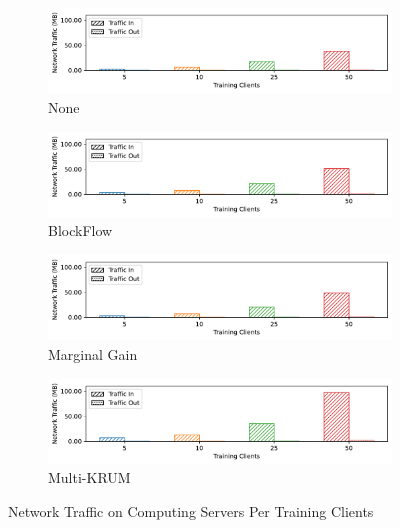 \begin{figure}[!hp]
    \centering
    \begin{subfigure}[b]{0.49\textwidth}
        \centering
        \includegraphics[width=\textwidth]{graphics/clients/net_none_server.pdf}
        \caption{None}
    \end{subfigure}
    \hfill
    \begin{subfigure}[b]{0.49\textwidth}
        \centering
        \includegraphics[width=\textwidth]{graphics/clients/net_blockflow_server.pdf}
        \caption{BlockFlow}
    \end{subfigure}
    \hfill
    \begin{subfigure}[b]{0.49\textwidth}
        \centering
        \includegraphics[width=\textwidth]{graphics/clients/net_marginalgain_server.pdf}
        \caption{Marginal Gain}
    \end{subfigure}
    \hfill
    \begin{subfigure}[b]{0.49\textwidth}
        \centering
        \includegraphics[width=\textwidth]{graphics/clients/net_multikrum_server.pdf}
        \caption{Multi-KRUM}
    \end{subfigure}
    \caption{Network Traffic on Computing Servers Per Training Clients}
    \label{fig:net_clients_degree_server}
\end{figure}

